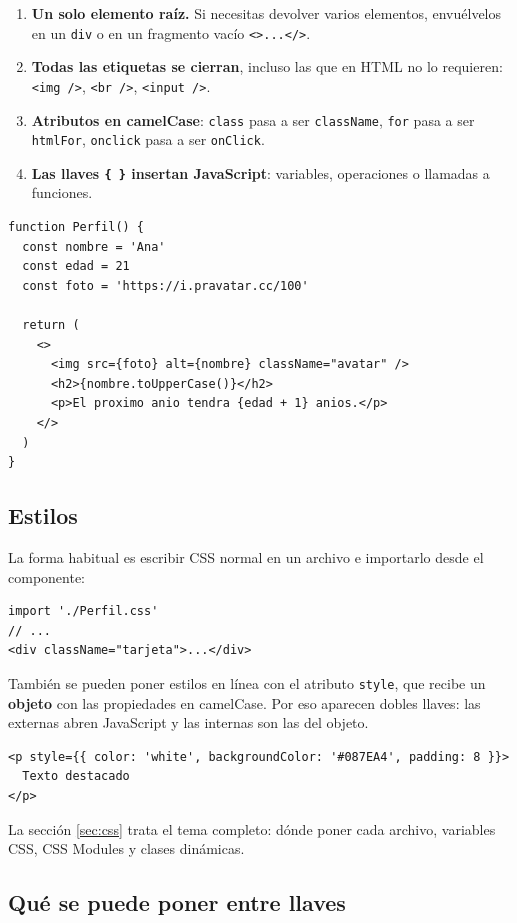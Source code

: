 \documentclass[11pt,a4paper]{article}
\newcommand{\cmd}[1]{\texttt{\color{reactdark}#1}}
\begin{document}
\begin{enumerate}[leftmargin=*]
  \item \textbf{Un solo elemento raíz.} Si necesitas devolver varios elementos, envuélvelos en un \cmd{div} o en un fragmento vacío \cmd{<>...</>}.
  \item \textbf{Todas las etiquetas se cierran}, incluso las que en HTML no lo requieren: \cmd{<img />}, \cmd{<br />}, \cmd{<input />}.
  \item \textbf{Atributos en camelCase}: \cmd{class} pasa a ser \cmd{className}, \cmd{for} pasa a ser \cmd{htmlFor}, \cmd{onclick} pasa a ser \cmd{onClick}.
  \item \textbf{Las llaves \cmd{\{ \}} insertan JavaScript}: variables, operaciones o llamadas a funciones.
\end{enumerate}

\begin{lstlisting}[language=JSX]
function Perfil() {
  const nombre = 'Ana'
  const edad = 21
  const foto = 'https://i.pravatar.cc/100'

  return (
    <>
      <img src={foto} alt={nombre} className="avatar" />
      <h2>{nombre.toUpperCase()}</h2>
      <p>El proximo anio tendra {edad + 1} anios.</p>
    </>
  )
}
\end{lstlisting}

\subsection{Estilos}

La forma habitual es escribir CSS normal en un archivo e importarlo desde el componente:
\begin{lstlisting}[language=JSX]
import './Perfil.css'
// ...
<div className="tarjeta">...</div>
\end{lstlisting}

También se pueden poner estilos en línea con el atributo \cmd{style}, que recibe un \textbf{objeto} con las propiedades en camelCase. Por eso aparecen dobles llaves: las externas abren JavaScript y las internas son las del objeto.
\begin{lstlisting}[language=JSX]
<p style={{ color: 'white', backgroundColor: '#087EA4', padding: 8 }}>
  Texto destacado
</p>
\end{lstlisting}

La sección \ref{sec:css} trata el tema completo: dónde poner cada archivo, variables CSS, CSS Modules y clases dinámicas.

\subsection{Qué se puede poner entre llaves}
\end{document}
